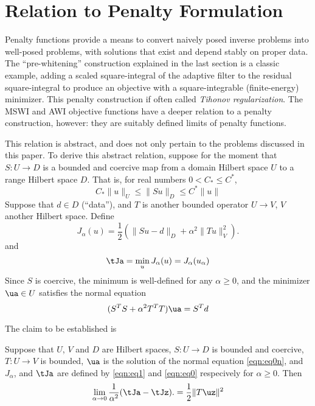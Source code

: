 \section{Relation to Penalty Formulation}
Penalty functions provide a means to convert naively posed
inverse problems into well-posed problems, with solutions that exist
and depend stably on proper data. The ``pre-whitening'' construction
explained in the last section is a classic example, adding a scaled
square-integral of the adaptive filter to the residual square-integral to
produce an objective with a square-integrable (finite-energy)
minimizer. This penalty construction if often called {\em Tihonov
  regularization}. The MSWI and AWI objective functions have a deeper
relation to a penalty construction, however: they are
suitably defined limits of penalty functions.

This relation is abstract, and does not only pertain to the problems
discussed in this paper. To derive this abstract relation, suppose for
the moment that $S:U \rightarrow D$ is a bounded and coercive map from a
domain Hilbert space $U$ to a range Hilbert space $D$. That is, for
real numbers $0 < C_* \le C^*$,
\[
  C_*\|u\|_U \le \|Su\|_D \le C^*\|u\|
\]
Suppose that $d \in D$ (``data''), and $T$ is another bounded operator $U \rightarrow V$, $V$
another Hilbert space. Define
\begin{equation}
  \label{eqn:eq1}
  J_{\alpha}(u) = \frac{1}{2}(\|Su-d\|_D + \alpha^2\|Tu\|_V^2).
\end{equation}
and
\begin{equation}
  \label{eqn:eq0}
  \tJa= \min_u J_{\alpha}(u) = J_{\alpha}(u_{\alpha})
\end{equation}
Since $S$ is coercive, the minimum is well-defined for any
$\alpha \ge 0$, and the minimizer $\ua \in U$ satisfies the normal
equation
\begin{equation}
  \label{eqn:eq0n}
  (S^TS + \alpha^2 T^TT) \ua = S^Td
\end{equation}

The claim to be established is
\begin{prop}
  \label{thm:alphalim}
  Suppose that $U$, $V$ and $D$ are Hilbert spaces,
  $S:U\rightarrow D$ is bounded and coercive, $T:U\rightarrow V$ is
  bounded, $\ua$ is the solution of
  the normal equation \ref{eqn:eq0n}, and $J_{\alpha}$,
  and $\tJa$ are defined by \ref{eqn:eq1} and \ref{eqn:eq0}
  respecively for $\alpha \ge 0$. Then
\begin{equation}
  \label{eqn:eq4}
  \lim_{\alpha \rightarrow 0} \frac{1}{\alpha^2}  (\tJa-\tJz).= \frac{1}{2}\|T\uz\|^2
\end{equation}
\end{prop}


